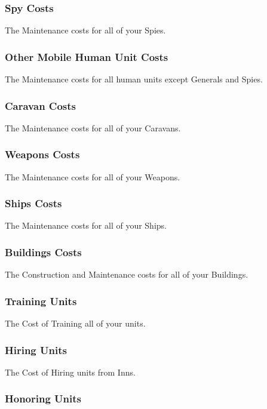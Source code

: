 \subsubsection{Spy Costs}

The Maintenance costs for all of your Spies.

\subsubsection{Other Mobile Human Unit Costs}

The Maintenance costs for all human units except Generals and Spies.

\subsubsection{Caravan Costs}

The Maintenance costs for all of your Caravans.

\subsubsection{Weapons Costs}

The Maintenance costs for all of your Weapons.

\subsubsection{Ships Costs}

The Maintenance costs for all of your Ships.

\subsubsection{Buildings Costs}

The Construction and Maintenance costs for all of your Buildings.

\subsubsection{Training Units}

The Cost of Training all of your units.

\subsubsection{Hiring Units}

The Cost of Hiring units from Inns.

\subsubsection{Honoring Units}


